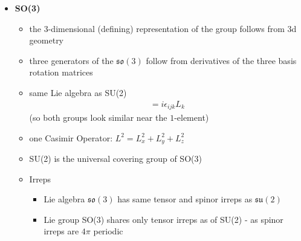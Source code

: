 \documentclass[10pt,a4paper]{report}
\theoremstyle{definition}
\begin{document}
\begin{itemize}
\item {\bf SO(3)}
\begin{itemize}
\item the 3-dimensional (defining) representation of the group follows from 3d geometry
\item three generators of the $\mathfrak{so}(3)$ follow from  derivatives of the three basis rotation matrices
\item same Lie algebra as SU(2)
\begin{align}
[L_i,L_j]=i\epsilon_{ijk}L_k
\end{align}
(so both groups look similar near the $1$-element)
\item one Casimir Operator: $L^2=L_x^2+L_y^2+L_z^2$
\item SU(2) is the universal covering group of SO(3)
\item Irreps
\begin{itemize}
\item Lie algebra $\mathfrak{so}(3)$ has same tensor and spinor irreps as $\mathfrak{su}(2)$
\item Lie group SO(3) shares only tensor irreps as of SU(2) - as spinor irreps are $4\pi$ periodic
\end{itemize}
\end{itemize}


\end{itemize}
\end{document}
